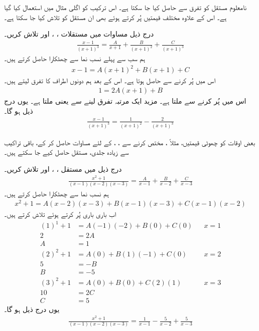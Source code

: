 
نامعلوم مستقل کو تفرق سے حاصل کیا جا سکتا ہے۔ اس ترکیب کو اگلی  مثال میں استعمال کیا گیا ہے۔ اس کے علاوہ مختلف قیمتیں پُر کرتے ہوئے بھی ان مستقل کو تلاش کیا جا سکتا ہے۔

درج ذیل مساوات میں مستقلات  ،  ، اور  تلاش کریں۔
\begin{align*}
\frac{x-1}{(x+1)^3}=\frac{A}{x+1}+\frac{B}{(x+1)^2}+\frac{C}{(x+1)^3}
\end{align*}
ہم  سب  سے پہلے نسب نما سے چھٹکارا حاصل کرتے ہیں۔
\begin{align*}
x-1=A(x+1)^2+B(x+1)+C
\end{align*}
اس میں  پُر کرنے سے  حاصل ہوتا ہے۔ اس کے بعد ہم دونوں اطراف کا تفرق لیتے ہیں۔
\begin{align*}
1=2A(x+1)+B
\end{align*}
اس میں  پُر کرنے سے  ملتا ہے۔ مزید ایک مرتبہ تفرق لینے سے  یعنی  ملتا ہے۔ یوں درج ذیل ہو گا۔
\begin{align*}
\frac{x-1}{(x+1)^3}=\frac{1}{(x+1)^2}-\frac{2}{(x+1)^3}
\end{align*}

بعض اوقات  کو چھوٹی قیمتیں، مثلاً ، مختص کرنے سے ، ،  کے لئے  مساوات حاصل کر کے، باقی تراکیب سے زیادہ جلدی، مستقل حاصل کیے جا سکتے ہیں۔

درج ذیل میں مستقل ، ،  اور  تلاش کریں۔
\begin{align*}
\frac{x^2+1}{(x-1)(x-2)(x-3)}=\frac{A}{x-1}+\frac{B}{x-2}+\frac{C}{x-3}
\end{align*}
ہم نسب نما سے چھٹکارا حاصل کرتے ہیں۔
\begin{align*}
x^2+1=A(x-2)(x-3)+B(x-1)(x-3)+C(x-1)(x-2)
\end{align*}
اب باری باری  پُر کرتے ہوئے  تلاش کرتے ہیں۔
\begin{align*}
(1)^1+1&=A(-1)(-2)+B(0)+C(0)&&x=1\\
2&=2A\\
A&=1\\
(2)^2+1&=A(0)+B(1)(-1)+C(0)&&x=2\\
5&=-B\\
B&=-5\\
(3)^2+1&=A(0)+B(0)+C(2)(1)&&x=3\\
10&=2C\\
C&=5
\end{align*}
یوں درج ذیل ہو گا۔
\begin{align*}
\frac{x^2+1}{(x-1)(x-2)(x-3)}=\frac{1}{x-1}-\frac{5}{x-2}+\frac{5}{x-3}
\end{align*}


